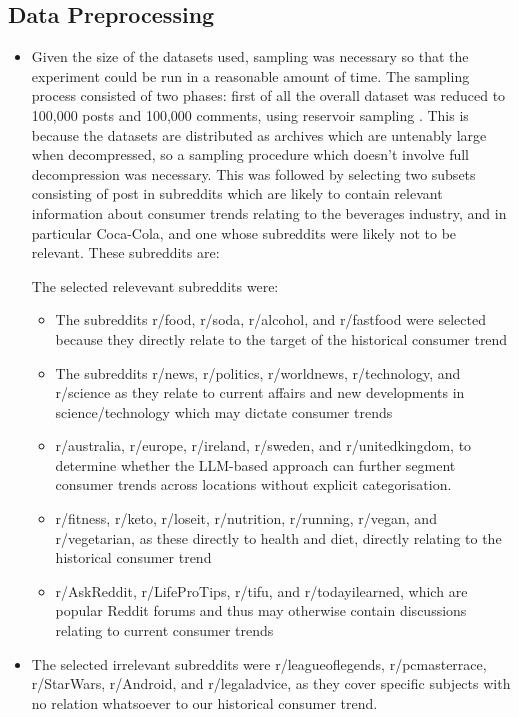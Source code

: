 \documentclass{report}
\begin{document}
\subsection{Data Preprocessing}

\begin{itemize}
\item Given the size of the datasets used, sampling was necessary so that the experiment could be run in a reasonable amount of time. The sampling process consisted of two phases: first of all the overall dataset was reduced to 100,000 posts and 100,000 comments, using reservoir sampling . This is because the datasets are distributed as archives which are untenably large when decompressed, so a sampling procedure which doesn't involve full decompression was necessary. This was followed by selecting two subsets consisting of post in subreddits which are likely to contain relevant information about consumer trends relating to the beverages industry, and in particular Coca-Cola, and one whose subreddits were likely not to be relevant. These subreddits are:

The selected relevevant subreddits were:
\begin{itemize}
\item The subreddits r/food, r/soda, r/alcohol, and r/fastfood were selected because they directly relate to the target of the historical consumer trend

\item The subreddits r/news, r/politics, r/worldnews, r/technology, and r/science as they relate to current affairs and new developments in science/technology which may dictate consumer trends

\item r/australia, r/europe, r/ireland, r/sweden, and r/unitedkingdom, to determine whether the LLM-based approach can further segment consumer trends across locations without explicit categorisation.

\item r/fitness, r/keto, r/loseit, r/nutrition, r/running, r/vegan, and r/vegetarian, as these directly to health and diet, directly relating to the historical consumer trend

\item r/AskReddit, r/LifeProTips, r/tifu, and r/todayilearned, which are popular Reddit forums and thus may otherwise contain discussions relating to current consumer trends
\end{itemize}

\item The selected irrelevant subreddits were r/leagueoflegends, r/pcmasterrace, r/StarWars, r/Android, and r/legaladvice, as they cover specific subjects with no relation whatsoever to our historical consumer trend.
\end{itemize}
\end{document}
